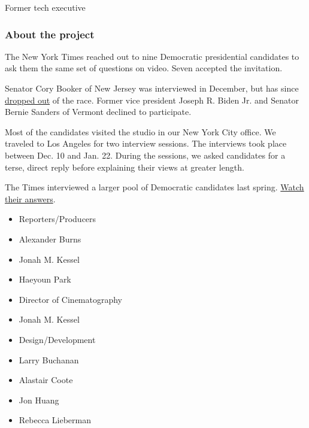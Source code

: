 Former tech executive

\hypertarget{about-the-project}{%
\subsubsection{\texorpdfstring{\textbf{About the
project}}{About the project}}\label{about-the-project}}

The New York Times reached out to nine Democratic presidential
candidates to ask them the same set of questions on video. Seven
accepted the invitation.

Senator Cory Booker of New Jersey was interviewed in December, but has
since
\href{https://www.nytimes.com/2020/01/13/us/politics/cory-booker-drops-out.html}{dropped
out} of the race. Former vice president Joseph R. Biden Jr. and Senator
Bernie Sanders of Vermont declined to participate.

Most of the candidates visited the studio in our New York City office.
We traveled to Los Angeles for two interview sessions. The interviews
took place between Dec. 10 and Jan. 22. During the sessions, we asked
candidates for a terse, direct reply before explaining their views at
greater length.

The Times interviewed a larger pool of Democratic candidates last
spring.
\href{https://www.nytimes.com/interactive/2019/us/politics/2020-candidate-interviews.html}{Watch
their answers}.

\begin{itemize}
\tightlist
\item
  Reporters/Producers
\item
  Alexander Burns
\item
  Jonah M. Kessel
\item
  Haeyoun Park
\end{itemize}

\begin{itemize}
\tightlist
\item
  Director of Cinematography
\item
  Jonah M. Kessel
\end{itemize}

\begin{itemize}
\tightlist
\item
  Design/Development
\item
  Larry Buchanan
\item
  Alastair Coote
\item
  Jon Huang
\item
  Rebecca Lieberman
\end{itemize}

